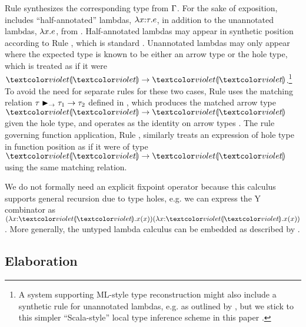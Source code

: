 Rule  synthesizes the corresponding type from $\Gamma$.
For the sake of exposition, \HazelnutLive includes ``half-annotated'' lambdas, $\lambda x{:}\tau.e$, in addition to the unannotated lambdas, $\lambda x.e$, from \Hazelnut.
%
Half-annotated lambdas may appear in synthetic position according to Rule , which is standard \cite{Chlipala:2005da}.
%
Unannotated lambdas may only appear where the expected type is known to be either an arrow type or the hole type, which is treated as if it were $\tarr{\tehole}{\tehole}$.\footnote{A system supporting ML-style type reconstruction \cite{damas1982principal} might also include a synthetic rule for unannotated lambdas, e.g. as outlined by \citet{DBLP:conf/icfp/DunfieldK13}, but we stick to this simpler ``Scala-style'' local type inference scheme in this paper \cite{Pierce:2000ve,Odersky:2001lb}.} 
%
To avoid the need for separate rules for these two cases, Rule  uses the matching relation $\tau \blacktriangleright_{\rightarrow} \tau_1 \rightarrow \tau_2$ defined in , which produces the matched arrow type $\tarr{\tehole}{\tehole}$ given the hole type, and operates as the identity on arrow types \cite{DBLP:conf/snapl/SiekVCB15,DBLP:conf/popl/GarciaC15}. The rule governing function application, Rule , similarly treats an expression of hole type in function position as if it were of type $\tarr{\tehole}{\tehole}$ using the same matching relation.
%
%
%
%


We do not formally need an explicit fixpoint operator because this calculus supports general recursion due to type holes, e.g. we can express the Y combinator as $(\halam{x}{\tehole}{x(x)}) (\halam{x}{\tehole}{x(x)})$. More generally, the untyped lambda calculus can be embedded as described by \citet{Siek06a}.

\vspace{-4px}
\subsection{Elaboration}
\label{sec:elaboration}
\vspace{-1px}

